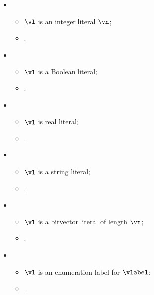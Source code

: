 \ProseParagraph
\OneApplies
\begin{itemize}
  \item {}
  \begin{itemize}
    \item $\vl$ is an integer literal $\vn$;
    \item {}.
  \end{itemize}

  \item {}
  \begin{itemize}
    \item $\vl$ is a Boolean literal;
    \item {}.
  \end{itemize}

  \item {}
  \begin{itemize}
    \item $\vl$ is real literal;
    \item {}.
  \end{itemize}

  \item {}
  \begin{itemize}
    \item $\vl$ is a string literal;
    \item {}.
  \end{itemize}

  \item {}
  \begin{itemize}
    \item $\vl$ is a bitvector literal of length $\vn$;
    \item {}.
  \end{itemize}

  \item {}
  \begin{itemize}
    \item $\vl$ is an enumeration label for $\vlabel$;
    \item {}.
  \end{itemize}
\end{itemize}

